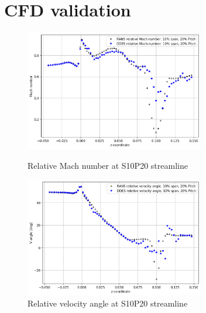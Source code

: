 
\chapter{CFD validation} %

\label{cfd_results} %

\begin{figure}[ht]
  \centering
  \includegraphics[width=0.7\textwidth]{Pictures/mach-rel-S10-P20.png}
  \caption{Relative Mach number at S10P20 streamline} \label{mach-rel-S10-P20}  
  \vspace*{\floatsep}%
  \includegraphics[width=0.7\textwidth]{Pictures/vang-rel-S10-P20.png}
  \caption{Relative velocity angle at S10P20 streamline} \label{vang-rel-S10-P20}
\end{figure}

